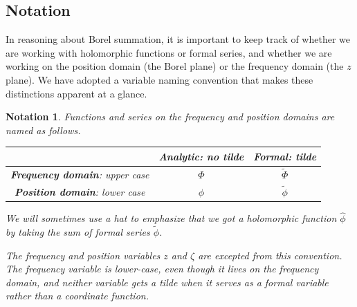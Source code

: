 \documentclass{article}
\newcommand{\series}[1]{\tilde{#1}}
\theoremstyle{definition}
\theoremstyle{plain}
\newtheorem*{notation*}{Notation}
\begin{document}
\subsection{Notation}
In reasoning about Borel summation, it is important to keep track of whether we are working with holomorphic functions or formal series, and whether we are working on the position domain (the Borel plane) or the frequency domain (the $z$ plane). We have adopted a variable naming convention that makes these distinctions apparent at a glance.
\begin{notation*}
Functions and series on the frequency and position domains are named as follows.
\begin{center}
\begin{tabular}{c|c|c}
& \textbf{Analytic}: no tilde & \textbf{Formal}: tilde \\[1mm] \hline
\vphantom{\rule{0mm}{5mm}} \textbf{Frequency domain}: upper case & $\Phi$ & $\series{\Phi}$ \\[1mm] \hline
\vphantom{\rule{0mm}{5mm}} \textbf{Position domain}: lower case & $\phi$ & $\series{\phi}$ \\[1mm]
\end{tabular}
\end{center}
We will sometimes use a hat to emphasize that we got a holomorphic function $\hat{\phi}$ by taking the sum of formal series $\series{\phi}$.

The frequency and position variables $z$ and $\zeta$ are excepted from this convention. The frequency variable is lower-case, even though it lives on the frequency domain, and neither variable gets a tilde when it serves as a formal variable rather than a coordinate function.
\end{notation*}
\end{document}
